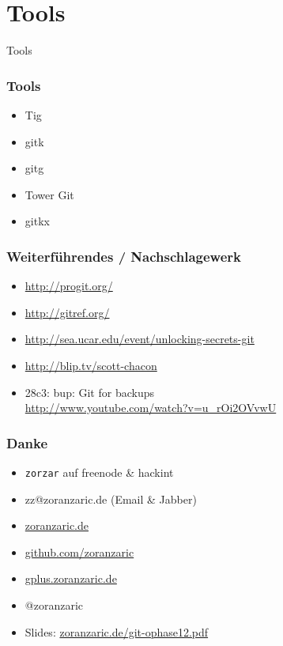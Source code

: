\documentclass[]{beamer}
\begin{document}
\section{Tools}
\begin{frame}
	\fontsize{30}{10}\selectfont Tools
\end{frame}

\begin{frame}
	\frametitle{Tools}
	\begin{itemize}
		\item
			Tig
		\item
			gitk
		\item
			gitg
		\item
			Tower Git
		\item
			gitkx
	\end{itemize}
\end{frame}

\begin{frame}
	\frametitle{Weiterführendes / Nachschlagewerk}
	\begin{itemize}
		\item
			\url{http://progit.org/}
		\item
			\url{http://gitref.org/}
		\item
			\url{http://sea.ucar.edu/event/unlocking-secrets-git}
		\item
			\url{http://blip.tv/scott-chacon}
		\item
			28c3: bup: Git for backups\\
			\url{http://www.youtube.com/watch?v=u_rOi2OVvwU}
	\end{itemize}
\end{frame}

\begin{frame}[fragile]
	\frametitle{Danke}
	\begin{itemize}
		\item
			\verb|zorzar| auf freenode \& hackint
		\item
			zz@zoranzaric.de (Email \& Jabber)
		\item
			\url{zoranzaric.de}
		\item
			\url{github.com/zoranzaric}
		\item
			\url{gplus.zoranzaric.de}
		\item
			@zoranzaric\\[0.5cm]
		\item
			Slides: \url{zoranzaric.de/git-ophase12.pdf}
	\end{itemize}
\end{frame}
\end{document}

